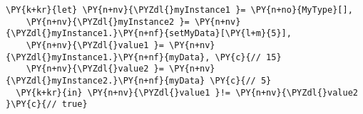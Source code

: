 \begin{Verbatim}[commandchars=\\\{\}]
\PY{k+kr}{let} \PY{n+nv}{\PYZdl{}myInstance1 }= \PY{n+no}{MyType}[],
    \PY{n+nv}{\PYZdl{}myInstance2 }= \PY{n+nv}{\PYZdl{}myInstance1.}\PY{n+nf}{setMyData}[\PY{l+m}{5}],
    \PY{n+nv}{\PYZdl{}value1 }= \PY{n+nv}{\PYZdl{}myInstance1.}\PY{n+nf}{myData}, \PY{c}{// 15}
    \PY{n+nv}{\PYZdl{}value2 }= \PY{n+nv}{\PYZdl{}myInstance2.}\PY{n+nf}{myData} \PY{c}{// 5}
  \PY{k+kr}{in} \PY{n+nv}{\PYZdl{}value1 }!= \PY{n+nv}{\PYZdl{}value2 }\PY{c}{// true}
\end{Verbatim}
